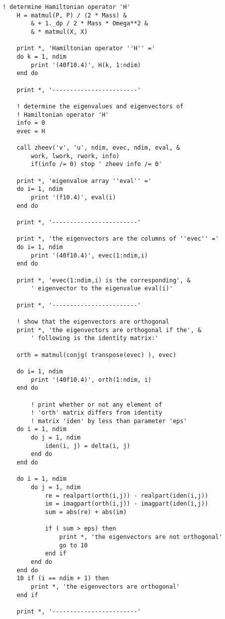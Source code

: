 \documentclass[12pt]{article}
\begin{document}
\begin{lstlisting}[frame=single,caption={{\tt Fortran 90} Code {\tt hrmosc.f90}},label=hrmosc]
    ! determine Hamiltonian operator 'H'
    H = matmul(P, P) / (2 * Mass) &
        & + 1._dp / 2 * Mass * Omega**2 &
        & * matmul(X, X)

    print *, 'Hamiltonian operator ''H'' ='
    do k = 1, ndim
        print '(40f10.4)', H(k, 1:ndim)
    end do

    print *, '------------------------'

    ! determine the eigenvalues and eigenvectors of 
    ! Hamiltonian operator 'H'
    info = 0 
    evec = H

    call zheev('v', 'u', ndim, evec, ndim, eval, &
        work, lwork, rwork, info)
        if(info /= 0) stop ' zheev info /= 0'

    print *, 'eigenvalue array ''eval'' ='
    do i= 1, ndim
        print '(f10.4)', eval(i)
    end do

    print *, '------------------------'

    print *, 'the eigenvectors are the columns of ''evec'' ='
    do i= 1, ndim
        print '(40f10.4)', evec(1:ndim,i)
    end do

    print *, 'evec(1:ndim,i) is the corresponding', &
        ' eigenvector to the eigenvalue eval(i)'

    print *, '------------------------'

    ! show that the eigenvectors are orthogonal
    print *, 'the eigenvectors are orthogonal if the', &
        ' following is the identity matrix:'

    orth = matmul(conjg( transpose(evec) ), evec)

    do i= 1, ndim
        print '(40f10.4)', orth(1:ndim, i)
    end do

        ! print whether or not any element of 
        ! 'orth' matrix differs from identity 
        ! matrix 'iden' by less than parameter 'eps' 
    do i = 1, ndim 
        do j = 1, ndim
            iden(i, j) = delta(i, j)
        end do
    end do

    do i = 1, ndim
        do j = 1, ndim
            re = realpart(orth(i,j)) - realpart(iden(i,j))
            im = imagpart(orth(i,j)) - imagpart(iden(i,j))
            sum = abs(re) + abs(im)

            if ( sum > eps) then
                print *, 'the eigenvectors are not orthogonal'
                go to 10
            end if
        end do
    end do
    10 if (i == ndim + 1) then
        print *, 'the eigenvectors are orthogonal'
    end if

    print *, '------------------------'


\end{lstlisting}
\end{document}
